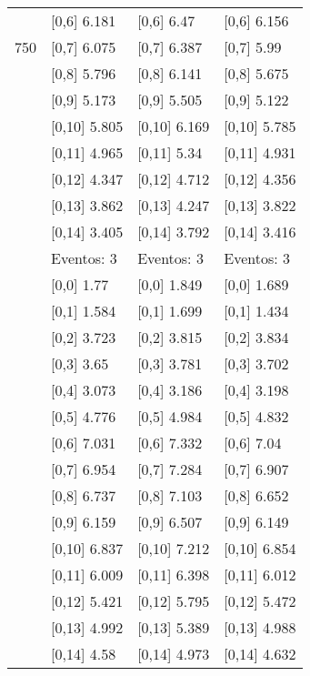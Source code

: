 \begin{table}
\begin{tabular}[t]{llll}
 & {}[0,6] 6.181 & {}[0,6] 6.47 & {}[0,6] 6.156\\
750 & {}[0,7] 6.075 & {}[0,7] 6.387 & {}[0,7] 5.99\\
\addlinespace
 & {}[0,8] 5.796 & {}[0,8] 6.141 & {}[0,8] 5.675\\
 & {}[0,9] 5.173 & {}[0,9] 5.505 & {}[0,9] 5.122\\
 & {}[0,10] 5.805 & {}[0,10] 6.169 & {}[0,10] 5.785\\
 & {}[0,11] 4.965 & {}[0,11] 5.34 & {}[0,11] 4.931\\
 & {}[0,12] 4.347 & {}[0,12] 4.712 & {}[0,12] 4.356\\
\addlinespace
 & {}[0,13] 3.862 & {}[0,13] 4.247 & {}[0,13] 3.822\\
 & {}[0,14] 3.405 & {}[0,14] 3.792 & {}[0,14] 3.416\\
 & Eventos:  3 & Eventos:  3 & Eventos:  3\\
 & {}[0,0] 1.77 & {}[0,0] 1.849 & {}[0,0] 1.689\\
 & {}[0,1] 1.584 & {}[0,1] 1.699 & {}[0,1] 1.434\\
\addlinespace
 & {}[0,2] 3.723 & {}[0,2] 3.815 & {}[0,2] 3.834\\
 & {}[0,3] 3.65 & {}[0,3] 3.781 & {}[0,3] 3.702\\
 & {}[0,4] 3.073 & {}[0,4] 3.186 & {}[0,4] 3.198\\
 & {}[0,5] 4.776 & {}[0,5] 4.984 & {}[0,5] 4.832\\
 & {}[0,6] 7.031 & {}[0,6] 7.332 & {}[0,6] 7.04\\
\addlinespace
1000 & {}[0,7] 6.954 & {}[0,7] 7.284 & {}[0,7] 6.907\\
 & {}[0,8] 6.737 & {}[0,8] 7.103 & {}[0,8] 6.652\\
 & {}[0,9] 6.159 & {}[0,9] 6.507 & {}[0,9] 6.149\\
 & {}[0,10] 6.837 & {}[0,10] 7.212 & {}[0,10] 6.854\\
 & {}[0,11] 6.009 & {}[0,11] 6.398 & {}[0,11] 6.012\\
\addlinespace
 & {}[0,12] 5.421 & {}[0,12] 5.795 & {}[0,12] 5.472\\
 & {}[0,13] 4.992 & {}[0,13] 5.389 & {}[0,13] 4.988\\
 & {}[0,14] 4.58 & {}[0,14] 4.973 & {}[0,14] 4.632\\
\bottomrule
\end{tabular}
\end{table}
